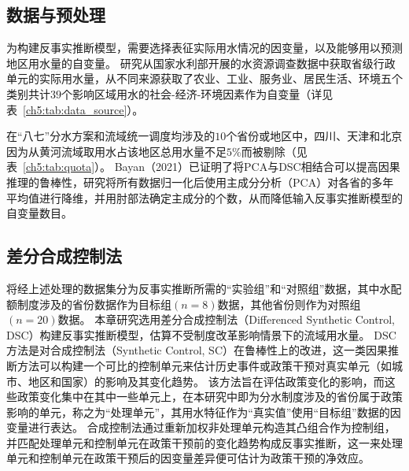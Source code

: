 \subsection{数据与预处理}\label{sec:dataset}

为构建反事实推断模型，需要选择表征实际用水情况的因变量，以及能够用以预测地区用水量的自变量。
研究从国家水利部开展的水资源调查数据中获取省级行政单元的实际用水量\cite{zhou2020}，从不同来源获取了农业、工业、服务业、居民生活、环境五个类别共计$39$个影响区域用水的社会-经济-环境因素作为自变量（详见表~\ref{ch5:tab:data_source}）。



在“八七”分水方案和流域统一调度均涉及的$10$个省份或地区中，四川、天津和北京因为从黄河流域取用水占该地区总用水量不足$5\%$而被剔除（见表~\ref{ch5:tab:quota}）。
Bayan（2021）\cite{bayani2021}已证明了将PCA与DSC相结合可以提高因果推理的鲁棒性，研究将所有数据归一化后使用主成分分析（PCA）对各省的多年平均值进行降维，并用肘部法确定主成分的个数，从而降低输入反事实推断模型的自变量数目。

\subsection{差分合成控制法}\label{sec:DSC}

将经上述处理的数据集分为反事实推断所需的“实验组”和“对照组”数据，其中水配额制度涉及的省份数据作为目标组$(n=8)$数据，其他省份则作为对照组$(n=20)$数据。
本章研究选用差分合成控制法（Differenced Synthetic Control, DSC）构建反事实推断模型，估算不受制度改革影响情景下的流域用水量。
DSC 方法是对合成控制法（Synthetic Control, SC）在鲁棒性上的改进\cite{billmeier2013, smith2015}，这一类因果推断方法可以构建一个可比的控制单元来估计历史事件或政策干预对真实单元（如城市、地区和国家）的影响及其变化趋势\cite{abadie2010, abadie2015, hill2021}。
该方法旨在评估政策变化的影响，而这些政策变化集中在其中一些单元上，在本研究中即为分水制度涉及的省份属于政策影响的单元，称之为“处理单元”，其用水特征作为“真实值”使用“目标组”数据的因变量进行表达。
合成控制法通过重新加权非处理单元构造其凸组合作为控制组，并匹配处理单元和控制单元在政策干预前的变化趋势构成反事实推断，这一来处理单元和控制单元在政策干预后的因变量差异便可估计为政策干预的净效应。

